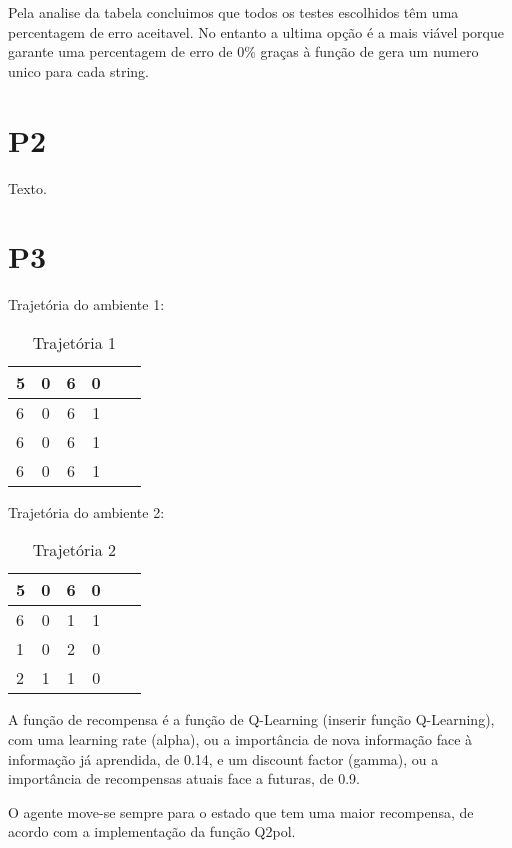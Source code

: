\documentclass{scrartcl}
\begin{document}
Pela analise da tabela concluimos que todos os testes escolhidos têm uma percentagem de erro aceitavel. No entanto a ultima opção é a mais viável porque garante uma percentagem de erro de 0\% graças à função de gera um numero unico para cada string.


\section*{P2}

Texto.

\section*{P3}

Trajetória do ambiente 1:\par

	\begin{table}[h!]
	  \centering
	  \caption{Trajetória 1}
	  \label{tab:Trajetória 1}
	  \begin{tabular}{|l|c|c|c|c|r|}
	  	\hline
	    5 & 0 & 6 & 0\\
	    \hline
	    6 & 0 & 6 & 1\\
	    \hline
	    6 & 0 & 6 & 1\\
	    \hline
	    6 & 0 & 6 & 1\\
	    \hline
	  \end{tabular}
	\end{table}
	\par

Trajetória do ambiente 2:\par

	\begin{table}[h!]
	  \centering
	  \caption{Trajetória 2}
	  \label{tab:Trajetória 2}
	  \begin{tabular}{|l|c|c|c|c|r|}
	  	\hline
	    5 & 0 & 6 & 0\\
	    \hline
	    6 & 0 & 1 & 1\\
	    \hline
	    1 & 0 & 2 & 0\\
	    \hline
	    2 & 1 & 1 & 0\\
	    \hline
	  \end{tabular}
	\end{table}
	\par

A função de recompensa é a função de Q-Learning (inserir função Q-Learning), com uma learning rate (alpha), ou a importância de nova informação face
à informação já aprendida, de 0.14, e um discount factor (gamma), ou a importância de recompensas atuais face a futuras, de 0.9.\par

O agente move-se sempre para o estado que tem uma maior recompensa, de acordo com a implementação da função Q2pol.\par
\end{document}
